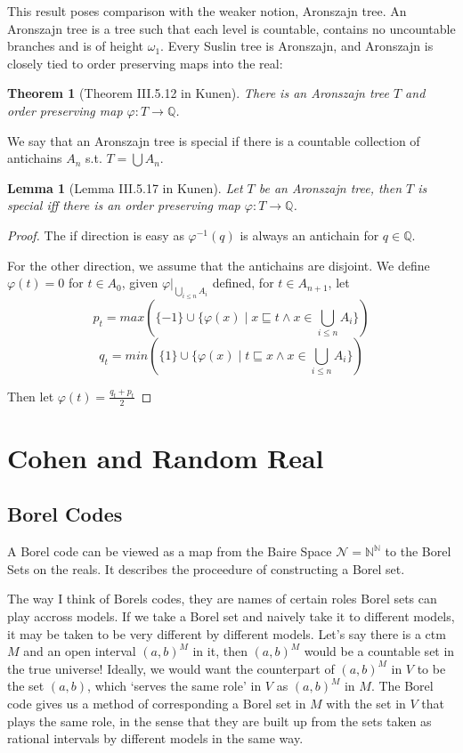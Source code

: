 \documentclass{article}
\newtheorem{lemma}{Lemma}
\newtheorem{theorem}{Theorem}
\newcommand{\bbQ}{\mathbb{Q}}
\begin{document}
This result poses comparison with the weaker notion, Aronszajn tree. 
An Aronszajn tree is a tree such that each level is countable, contains no uncountable branches and is of height $\omega_1$. Every Suslin tree is Aronszajn, and Aronszajn is closely tied to order preserving maps into the real:

\begin{theorem}[Theorem III.5.12 in Kunen]
    There is an Aronszajn tree $T$ and order preserving map $\varphi: T\to \mathbb{Q}$.
\end{theorem}



We say that an Aronszajn tree is special if there is a countable collection of antichains $A_n$ s.t. $T = \bigcup A_n$.

\begin{lemma}[Lemma III.5.17 in Kunen]
    Let $T$ be an Aronszajn tree, then $T$ is special iff there is an order preserving map $\varphi:T\to \bbQ$.
\end{lemma}

\begin{proof}
    The if direction is easy as $\varphi^{-1}(q)$ is always an antichain for $q\in \bbQ$.

    For the other direction, we assume that the antichains are disjoint. We define $\varphi(t) = 0$ for $t\in A_0$, given $\varphi|_{\bigcup_{i\leq n}{A_i}}$ defined, for $t\in A_{n+1}$, let $$p_t = max(\{-1\}\cup \{\varphi(x)\mid x\sqsubseteq t\land x\in \bigcup_{i\leq n}A_i\})$$
    $$q_t = min(\{1\}\cup \{\varphi(x)\mid t\sqsubseteq x\land x\in \bigcup_{i\leq n}A_i\})$$

    Then let $\varphi(t) = \frac{q_t+p_t}{2}$
\end{proof}

\section{Cohen and Random Real}

\subsection{Borel Codes}

A Borel code can be viewed as a map from the Baire Space $\mathcal{N} = \mathbb{N}^\mathbb{N}$ to the Borel Sets on the reals. It describes the proceedure of constructing a Borel set.

The way I think of Borels codes, they are names of certain roles Borel sets can play accross models. If we take a Borel set and naively take it to different models, it may be taken to be very different by different models. Let's say there is a ctm $M$ and an open interval $(a,b)^M$ in it, then $(a,b)^M$ would be a countable set in the true universe! Ideally, we would want the counterpart of $(a,b)^M$ in $V$ to be the set $(a,b)$, which `serves the same role' in $V$ as $(a,b)^M$ in $M$. The Borel code gives us a method of corresponding a Borel set in $M$ with the set in $V$ that plays the same role, in the sense that they are built up from the sets taken as rational intervals by different models in the same way.
\end{document}
